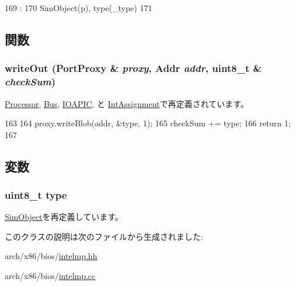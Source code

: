 \begin{DoxyCode}
169                                                                        :
170     SimObject(p), type(_type)
171 {}

\end{DoxyCode}


\subsection{関数}
\hypertarget{classX86ISA_1_1IntelMP_1_1BaseConfigEntry_a5fffc1006b1f28bd779d83ffbe213b4f}{
\subsubsection[{writeOut}]{ writeOut ({\bf PortProxy} \& {\em proxy}, \/  {\bf Addr} {\em addr}, \/  uint8\_\-t \& {\em checkSum})}}
\label{classX86ISA_1_1IntelMP_1_1BaseConfigEntry_a5fffc1006b1f28bd779d83ffbe213b4f}


\hyperlink{classX86ISA_1_1IntelMP_1_1Processor_a5fffc1006b1f28bd779d83ffbe213b4f}{Processor}, \hyperlink{classX86ISA_1_1IntelMP_1_1Bus_a5fffc1006b1f28bd779d83ffbe213b4f}{Bus}, \hyperlink{classX86ISA_1_1IntelMP_1_1IOAPIC_a5fffc1006b1f28bd779d83ffbe213b4f}{IOAPIC}, と \hyperlink{classX86ISA_1_1IntelMP_1_1IntAssignment_a5fffc1006b1f28bd779d83ffbe213b4f}{IntAssignment}で再定義されています。


\begin{DoxyCode}
163 {
164     proxy.writeBlob(addr, &type, 1);
165     checkSum += type;
166     return 1;
167 }
\end{DoxyCode}


\subsection{変数}
\hypertarget{classX86ISA_1_1IntelMP_1_1BaseConfigEntry_a1d127017fb298b889f4ba24752d08b8e}{
\subsubsection[{type}]{\setlength{\rightskip}{0pt plus 5cm}uint8\_\-t {\bf type}}}
\label{classX86ISA_1_1IntelMP_1_1BaseConfigEntry_a1d127017fb298b889f4ba24752d08b8e}


\hyperlink{classm5_1_1SimObject_1_1SimObject_acce15679d830831b0bbe8ebc2a60b2ca}{SimObject}を再定義しています。

このクラスの説明は次のファイルから生成されました:\begin{DoxyCompactItemize}
\item 
arch/x86/bios/\hyperlink{intelmp_8hh}{intelmp.hh}\item 
arch/x86/bios/\hyperlink{intelmp_8cc}{intelmp.cc}\end{DoxyCompactItemize}
